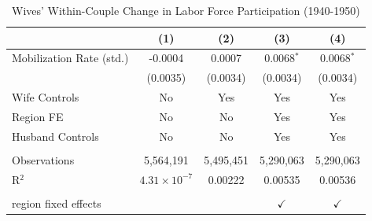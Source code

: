 
\begin{table}[htbp]
   \caption{\label{tab:wives_main} Wives' Within-Couple Change in Labor Force Participation (1940-1950)}
   \bigskip
   \centering
   \begin{tabular}{lcccc}
      \toprule
                               & (1)                   & (2)       & (3)           & (4)\\  
      \midrule 
      Mobilization Rate (std.) & -0.0004               & 0.0007    & 0.0068$^{*}$  & 0.0068$^{*}$\\   
                               & (0.0035)              & (0.0034)  & (0.0034)      & (0.0034)\\   
      Wife Controls            & No                    & Yes       & Yes           & Yes\\  
      Region FE                & No                    & No        & Yes           & Yes\\  
      Husband Controls         & No                    & No        & Yes           & Yes\\  
       \\
      Observations             & 5,564,191             & 5,495,451 & 5,290,063     & 5,290,063\\  
      R$^2$                    & $4.31\times 10^{-7}$  & 0.00222   & 0.00535       & 0.00536\\  
       \\
      region fixed effects     &                       &           & $\checkmark$  & $\checkmark$\\   
      \bottomrule
   \end{tabular}
\end{table}


